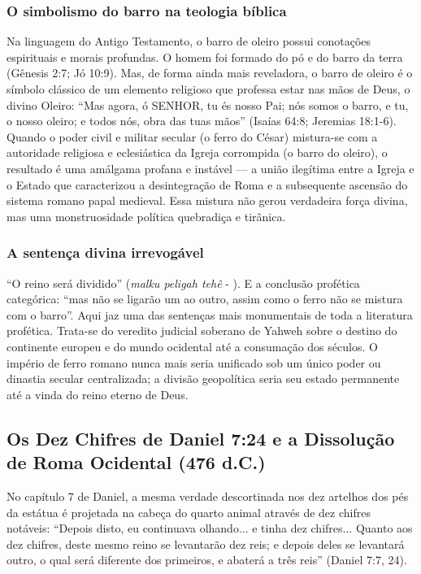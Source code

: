 \documentclass[11pt,a4paper,openany]{book}
\begin{document}
\subsubsection*{O simbolismo do barro na teologia bíblica}
Na linguagem do Antigo Testamento, o barro de oleiro possui conotações espirituais e morais profundas. O homem foi formado do pó e do barro da terra (Gênesis 2:7; Jó 10:9). Mas, de forma ainda mais reveladora, o barro de oleiro é o símbolo clássico de um elemento religioso que professa estar nas mãos de Deus, o divino Oleiro: ``Mas agora, ó SENHOR, tu és nosso Pai; nós somos o barro, e tu, o nosso oleiro; e todos nós, obra das tuas mãos'' (Isaías 64:8; Jeremias 18:1-6).
Quando o poder civil e militar secular (o ferro do César) mistura-se com a autoridade religiosa e eclesiástica da Igreja corrompida (o barro do oleiro), o resultado é uma amálgama profana e instável — a união ilegítima entre a Igreja e o Estado que caracterizou a desintegração de Roma e a subsequente ascensão do sistema romano papal medieval. Essa mistura não gerou verdadeira força divina, mas uma monstruosidade política quebradiça e tirânica.


\subsubsection*{A sentença divina irrevogável}
``O reino será dividido'' (\textit{malku peligah tehê} - ). E a conclusão profética categórica: ``mas não se ligarão um ao outro, assim como o ferro não se mistura com o barro''.
Aqui jaz uma das sentenças mais monumentais de toda a literatura profética. Trata-se do veredito judicial soberano de Yahweh sobre o destino do continente europeu e do mundo ocidental até a consumação dos séculos. O império de ferro romano nunca mais seria unificado sob um único poder ou dinastia secular centralizada; a divisão geopolítica seria seu estado permanente até a vinda do reino eterno de Deus.


\subsection{Os Dez Chifres de Daniel 7:24 e a Dissolução de Roma Ocidental (476 d.C.)}


No capítulo 7 de Daniel, a mesma verdade descortinada nos dez artelhos dos pés da estátua é projetada na cabeça do quarto animal através de dez chifres notáveis:
``Depois disto, eu continuava olhando... e tinha dez chifres... Quanto aos dez chifres, deste mesmo reino se levantarão dez reis; e depois deles se levantará outro, o qual será diferente dos primeiros, e abaterá a três reis'' (Daniel 7:7, 24).
\end{document}
